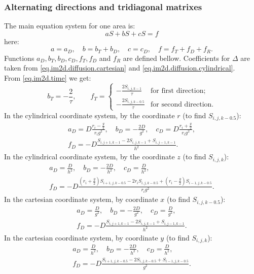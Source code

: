 \documentclass[a4paper,10pt]{article}
\begin{document}
\subsubsection{Alternating directions and tridiagonal matrixes}
The main equation system for one area is:
\begin{equation}
    a S + b S + c S = f
\end{equation}
here:
\begin{equation}
    a = a_D,\quad
    b = b_T + b_D,\quad
    c = c_D,\quad
    f = f_T + f_D + f_R.
\end{equation}
Functions $a_D, b_T, b_D, c_D, f_T, f_D$ and $ f_R$ are defined bellow.
Coefficients for $\Delta$ are taken from \eqref{eq.im2d.diffusion.cartesian}
and \eqref{eq.im2d.diffusion.cylindrical}.\\
From \eqref{eq.im2d.time} we get:
\begin{equation}
    b_T = -\frac{2}{\tau},\qquad
    f_T = \begin{cases}
            -\frac{2 S_{i,j,k-1  }}{\tau} & \text{for first direction};\\
            -\frac{2 S_{i,j,k-0.5}}{\tau} & \text{for second direction.}
          \end{cases}
\end{equation}
In the cylindrical coordinate system, by the coordinate $r$ (to find $S_{i,j,k-0.5}$):
\begin{multline}
    a_D = D \frac{r_i - \frac{g}{2}}{r_i g^2},\quad
    b_D = -\frac{2 D}{g^2},\quad
    c_D = D \frac{r_i + \frac{g}{2}}{r_i g^2},\\
    f_D = -D \frac{S_{i,j+1,k-1} - 2 S_{i,j,k-1} + S_{i,j-1,k-1}}{h^2}.
\end{multline}
In the cylindrical coordinate system, by the coordinate $z$ (to find $S_{i,j,k}$):
\begin{multline}
    a_D = \frac{D}{h^2},\quad
    b_D = -\frac{2 D}{h^2},\quad
    c_D = \frac{D}{h^2},\\
    f_D = - D \frac{ (r_i + \frac{g}{2})S_{i+1,j,k-0.5} - 2 r_i S_{i,j,k-0.5} + (r_i - \frac{g}{2}) S_{i-1,j,k-0.5} }{r_i g^2}.
\end{multline}
In the cartesian coordinate system, by coordinate $x$ (to find $S_{i,j,k-0.5}$):
\begin{multline}
    a_D = \frac{D}{g^2},\quad
    b_D = -\frac{2 D}{g^2},\quad
    c_D = \frac{D}{g^2},\\
    f_D = - D \frac{S_{i,j+1,k-1} - 2 S_{i,j,k-1} + S_{i,j-1,k-1}}{h^2}.
\end{multline}
In the cartesian coordinate system, by coordinate $y$ (to find $S_{i,j,k}$):
\begin{multline}
    a_D = \frac{D}{h^2},\quad
    b_D = -\frac{2 D}{h^2},\quad
    c_D = \frac{D}{h^2},\\
    f_D = - D \frac{S_{i+1,j,k-0.5} - 2 S_{i,j,k-0.5} + S_{i-1,j,k-0.5}}{g^2}.
\end{multline}
\end{document}
